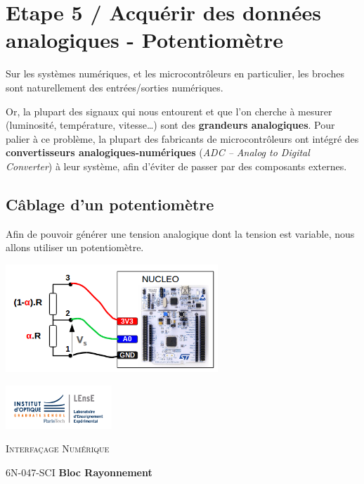 \documentclass[a4paper,11pt,titlepage]{article} %
\begin{document}
\section{Etape 5 / Acquérir des données analogiques - Potentiomètre}

Sur les systèmes numériques, et les microcontrôleurs en particulier, les broches sont naturellement des entrées/sorties numériques.

Or, la plupart des signaux qui nous entourent et que l'on cherche à mesurer (luminosité, température, vitesse…) sont des \textbf{grandeurs analogiques}. Pour palier à ce problème, la plupart des fabricants de microcontrôleurs ont intégré des \textbf{convertisseurs analogiques-numériques} (\textit{ADC – Analog to Digital Converter}) à leur système, afin d'éviter de passer par des composants externes.


\subsection{Câblage d'un potentiomètre}

Afin de pouvoir générer une tension analogique dont la tension est variable, nous allons utiliser un potentiomètre.

\begin{center}
	\includegraphics[width=0.6\textwidth]{images/MINE_Nucleo_CablagePotentiometre.png}
\end{center}







\newpage
\begin{minipage}[c]{.25\linewidth}
	\includegraphics[width=4cm]{images/Logo-LEnsE.png}
\end{minipage} \hfill
\begin{minipage}[c]{.4\linewidth}

\begin{center}
\vspace{0.3cm}
{\Large \textsc{Interfaçage Numérique}}

\medskip

6N-047-SCI \qquad \textbf{\large Bloc Rayonnement}

\end{center}
\end{minipage}\hfill
\end{document}
